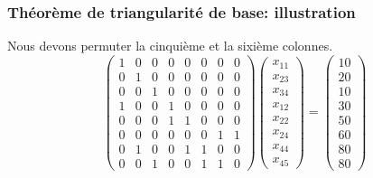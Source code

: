\documentclass[usepdftitle=false, aspectratio=169]{beamer}
\begin{document}
\begin{frame}
\frametitle{Théorème de triangularité de base: illustration}

Nous devons permuter la cinquième et la sixième colonnes.
\[
\begin{pmatrix}
 1 & 0 & 0 & 0 & 0 & 0 & 0 & 0 \\
 0 & 1 & 0 & 0 & 0 & 0 & 0 & 0 \\
 0 & 0 & 1 & 0 & 0 & 0 & 0 & 0 \\
 1 & 0 & 0 & 1 & 0 & 0 & 0 & 0 \\
 0 & 0 & 0 & 1 & 1 & 0 & 0 & 0 \\
 0 & 0 & 0 & 0 & 0 & 0 & 1 & 1 \\
 0 & 1 & 0 & 0 & 1 & 1 & 0 & 0 \\
 0 & 0 & 1 & 0 & 0 & 1 & 1 & 0
\end{pmatrix}
\begin{pmatrix}
x_{11} \\
x_{23} \\
x_{34} \\
x_{12} \\
x_{22} \\
x_{24} \\
x_{44} \\
x_{45}
\end{pmatrix}
=
\begin{pmatrix}
10 \\
20 \\
10 \\
30 \\
50 \\
60 \\
80 \\
80
\end{pmatrix}
\]

\end{frame}
\end{document}
